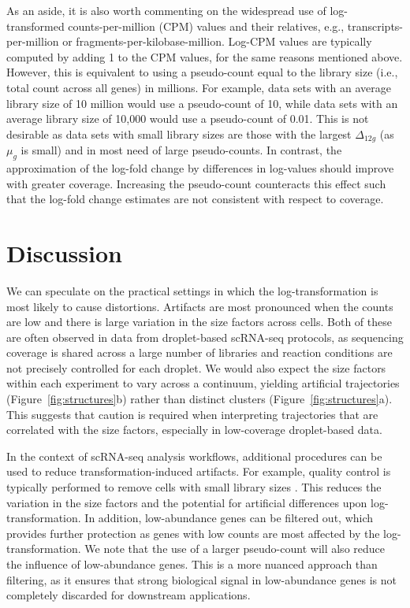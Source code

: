 \documentclass[10pt,letterpaper]{article}
\begin{document}
As an aside, it is also worth commenting on the widespread use of log-transformed counts-per-million (CPM) values and their relatives, e.g., transcripts-per-million or fragments-per-kilobase-million.
Log-CPM values are typically computed by adding 1 to the CPM values, for the same reasons mentioned above.
However, this is equivalent to using a pseudo-count equal to the library size (i.e., total count across all genes) in millions.
For example, data sets with an average library size of 10 million would use a pseudo-count of 10, while data sets with an average library size of 10,000 would use a pseudo-count of 0.01.
This is not desirable as data sets with small library sizes are those with the largest $\Delta_{12g}$ (as $\mu_g$ is small) and in most need of large pseudo-counts.
In contrast, the approximation of the log-fold change by differences in log-values should improve with greater coverage.
Increasing the pseudo-count counteracts this effect such that the log-fold change estimates are not consistent with respect to coverage.

\section{Discussion}
We can speculate on the practical settings in which the log-transformation is most likely to cause distortions.
Artifacts are most pronounced when the counts are low and there is large variation in the size factors across cells.
Both of these are often observed in data from droplet-based scRNA-seq protocols, as sequencing coverage is shared across a large number of libraries and reaction conditions are not precisely controlled for each droplet.
We would also expect the size factors within each experiment to vary across a continuum, yielding artificial trajectories (Figure~\ref{fig:structures}b) rather than distinct clusters (Figure~\ref{fig:structures}a).
This suggests that caution is required when interpreting trajectories that are correlated with the size factors, especially in low-coverage droplet-based data.

In the context of scRNA-seq analysis workflows, additional procedures can be used to reduce transformation-induced artifacts.
For example, quality control is typically performed to remove cells with small library sizes \cite{ilicic2016classification,lun2016stepbystep}.
This reduces the variation in the size factors and the potential for artificial differences upon log-transformation.
In addition, low-abundance genes can be filtered out, which provides further protection as genes with low counts are most affected by the log-transformation.
We note that the use of a larger pseudo-count will also reduce the influence of low-abundance genes.
This is a more nuanced approach than filtering, as it ensures that strong biological signal in low-abundance genes is not completely discarded for downstream applications.
\end{document}
